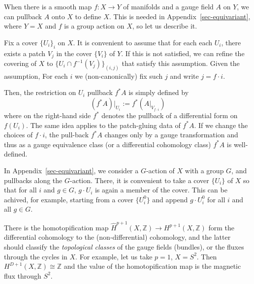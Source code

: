 \documentclass[11pt,toc=bibliography]{scrbook}
\numberwithin{equation}{section}
\begin{document}
When there is a smooth map \(f: X \to Y\) of manifolds and a gauge field
\(A\) on \(Y\), we can pullback \(A\) onto \(X\) to define \(X\). This
is needed in Appendix~\ref{sec-equivariant}, where \(Y = X\) and \(f\)
is a group action on \(X\), so let us describe it.

Fix a cover \(\{U_i\}_i\) on \(X\). It is convenient to assume that for
each each \(U_i\), there exists a patch \(V_j\) in the cover \(\{V_i\}\)
of \(Y\). If this is not satisfied, we can refine the covering of \(X\)
to \(\{U_i\cap f^{-1}(V_j)\}_{(i,j)}\) that satisfy this assumption.
Given the assumption, For each \(i\) we (non-canonically) fix such \(j\)
and write \(j = f\cdot i\).

Then, the restriction on \(U_i\) pullback \(f^*A\) is simply defined by
\[
(f^*A)|_{U_i} := f^*(A|_{V_{f\cdot i}})
\] where on the right-hand side \(f^*\) denotes the pullback of a
differential form on \(f(U_i)\). The same idea applies to the
patch-gluing data of \(f^*A\). If we change the choices of \(f\cdot i\),
the pull-back \(f^* A\) changes only by a gauge transformation and thus
as a gauge equivalence class (or a differential cohomology class)
\(f^* A\) is well-defined.

In Appendix~\ref{sec-equivariant}, we consider a \(G\)-action of \(X\)
with a group \(G\), and pullbacks along the \(G\)-action. There, it is
convenient to take a cover \(\{U_i\}\) of \(X\) so that for all \(i\)
and \(g\in G\), \(g\cdot U_i\) is again a member of the cover. This can
be achived, for example, starting from a cover \(\{U_i^0\}\) and append
\(g\cdot U_i^0\) for all \(i\) and all \(g\in G\).

\begin{tcolorbox}[enhanced jigsaw, opacityback=0, opacitybacktitle=0.6, leftrule=.75mm, arc=.35mm, coltitle=black, breakable, colframe=quarto-callout-note-color-frame, titlerule=0mm, colback=white, bottomrule=.15mm, left=2mm, colbacktitle=quarto-callout-note-color!10!white, toptitle=1mm, bottomtitle=1mm, title=\textcolor{quarto-callout-note-color}{\faInfo}\hspace{0.5em}{Note \ref*{nte-homotopification-and-flux}: Homotopification and Flux}, rightrule=.15mm, toprule=.15mm]


There is the homotopification map
\(\hat{H}^{p+1}(X,\mathbb{Z}) \to H^{p+1}(X,\mathbb{Z})\) form the
differential cohomology to the (non-differential) cohomology, and the
latter should classify the \emph{topological classes} of the gauge
fields (bundles), or the fluxes through the cycles in \(X\). For
example, let us take \(p=1\), \(X=S^2\). Then
\(H^{D+1}(X,\mathbb{Z})\cong \mathbb{Z}\) and the value of the
homotopification map is the magnetic flux through \(S^2\).

\end{tcolorbox}
\end{document}
